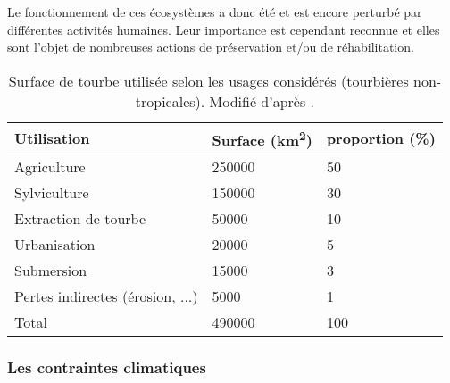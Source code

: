 Le fonctionnement de ces écosystèmes a donc été et est encore perturbé par différentes activités humaines.
Leur importance est cependant reconnue et elles sont l'objet de nombreuses actions de préservation et/ou de réhabilitation.
\begin{table}[]
\centering
\caption{Surface de tourbe utilisée selon les usages considérés (tourbières non-tropicales). Modifié d'après \citet{joosten2002}.}
\label{table:tourbeUsage}
\begin{tabular}{lll}\toprule
Utilisation & Surface (\si{\square\kilo\meter})  & proportion (\%) \\ \midrule
Agriculture & \num{250000} & \num{50} \\ 
Sylviculture & \num{150000} & \num{30}\\ 
Extraction de tourbe & \num{50000} & \num{10}\\ 
Urbanisation & \num{20000} & \num{5}\\ 
Submersion & \num{15000} & \num{3}\\ 
Pertes indirectes (érosion, ...) & \num{5000} & \num{1}\\[1ex]
Total & \num{490000} & \num{100}\\
\bottomrule
\end{tabular}
\end{table}


\subsubsection{Les contraintes climatiques}

